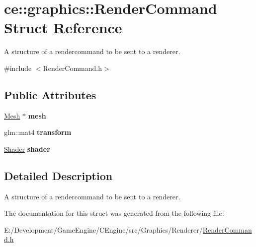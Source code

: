 \hypertarget{structce_1_1graphics_1_1_render_command}{}\section{ce\+:\+:graphics\+:\+:Render\+Command Struct Reference}
\label{structce_1_1graphics_1_1_render_command}


A structure of a rendercommand to be sent to a renderer.  




{\ttfamily \#include $<$Render\+Command.\+h$>$}

\subsection*{Public Attributes}
\begin{DoxyCompactItemize}
\item 
\mbox{\label{structce_1_1graphics_1_1_render_command_aea0982beaba0aecd4bc10f0e9f84d741}} 
\hyperlink{classce_1_1graphics_1_1_mesh}{Mesh} $\ast$ {\bfseries mesh}
\item 
\mbox{\label{structce_1_1graphics_1_1_render_command_a917fc9ebe6d75b747bac29e70a7fad3c}} 
glm\+::mat4 {\bfseries transform}
\item 
\mbox{\label{structce_1_1graphics_1_1_render_command_a1cb0de110a1a1c7cc1ab3d8b3ec5e43b}} 
\hyperlink{classce_1_1graphics_1_1_shader}{Shader} {\bfseries shader}
\end{DoxyCompactItemize}


\subsection{Detailed Description}
A structure of a rendercommand to be sent to a renderer. 

The documentation for this struct was generated from the following file\+:\begin{DoxyCompactItemize}
\item 
E\+:/\+Development/\+Game\+Engine/\+C\+Engine/src/\+Graphics/\+Renderer/\hyperlink{_render_command_8h}{Render\+Command.\+h}\end{DoxyCompactItemize}
